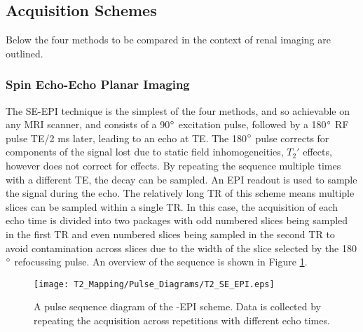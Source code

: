 \subsection{\ttwo Acquisition Schemes}
\label{subsec:t2_acquisition_schemes}
Below the four methods to be compared in the context of renal imaging are outlined.

\subsubsection{Spin Echo-Echo Planar Imaging}
The \acf{SE}-\acf{EPI} technique is the simplest of the four methods, and so achievable on any \ac{MRI} scanner, and consists of a 90$\degree$ excitation pulse, followed by a 180$\degree$ \ac{RF} pulse \ac{TE}/2 ms later, leading to an echo at \ac{TE}. The 180$\degree$ pulse corrects for components of the signal lost due to static field inhomogeneities, $T_2'$ effects, however does not correct for \ttwo effects. By repeating the sequence multiple times with a different \ac{TE}, the \ttwo decay can be sampled. An \ac{EPI} readout is used to sample the signal during the echo. The relatively long \ac{TR} of this scheme means multiple slices can be sampled within a single \ac{TR}. In this case, the acquisition of each echo time is divided into two packages with odd numbered slices being sampled in the first \ac{TR} and even numbered slices being sampled in the second \ac{TR} to avoid contamination across slices due to the width of the slice selected by the 180$\degree$ refocussing pulse. An overview of the sequence is shown in Figure \ref{fig:t2_se-epi_seq}.

\begin{figure}[H]
	\centering
	\texttt{[image: T2\_Mapping/Pulse\_Diagrams/T2\_SE\_EPI.eps]}
	\caption{A pulse sequence diagram of the -\ac{EPI} scheme. Data is collected by repeating the acquisition across repetitions with different echo times.}
	\label{fig:t2_se-epi_seq}	
\end{figure}

\newpage
